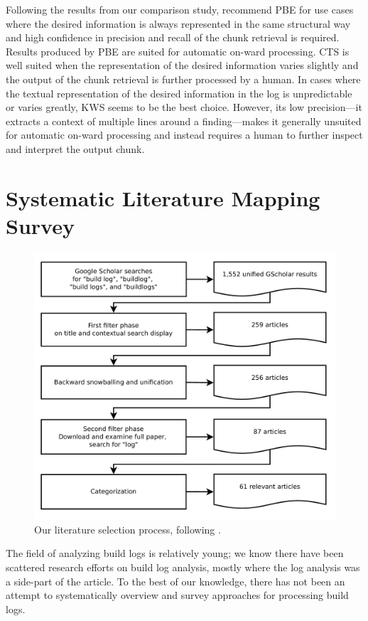 Following the results from our comparison study,
recommend PBE for use cases where the desired information is always
represented in the same structural way and high confidence in precision
and recall of the chunk retrieval is required.
Results produced by PBE are suited for automatic on-ward processing.
CTS is well suited when the representation of the desired information
varies
slightly and the output of the chunk retrieval is further processed by
a human.
In cases where the textual representation of the desired information in
the log
is unpredictable or varies greatly, KWS seems to be the best choice.
However,
its low precision---it extracts a context of multiple lines around a
finding---makes it generally unsuited for automatic on-ward processing and
instead requires a human to further inspect and interpret the output
chunk.

\section{Systematic Literature Mapping Survey}
\label{sec:survey}

\begin{figure}[htb]
	\centering
	\includegraphics[width=\columnwidth, clip]{img/lit_survey.pdf}
	\caption{Our literature selection process, following
	\cite{petersen2015guidelines}.}
	\label{fig:lit-survey}
\end{figure}

The field of analyzing build
logs is relatively young; we know there have been scattered
research efforts on build log analysis, mostly where the
log analysis was a side-part of the article.
To the best of our
knowledge, there has not been an attempt to systematically overview
and survey approaches for processing build logs.

